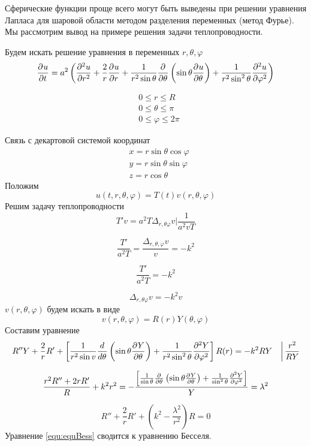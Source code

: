 Сферические функции проще всего могут быть выведены при решении уравнения Лапласа для шаровой области методом разделения переменных (метод Фурье). \\
Мы рассмотрим вывод на примере решения задачи теплопроводности.

Будем искать решение уравнения в переменных $r, \theta, \varphi$
\[
    \frac{\partial^{}u}{\partial t^{}} = a^2 \left(\frac{\partial^{2}u}{\partial r^{2}} + \frac{2}{r} \frac{\partial^{}u}{\partial r^{}} + \frac{1}{r^2 \sin \theta} \frac{\partial^{}}{\partial \theta^{}} \left(\sin \theta \frac{\partial^{}u}{\partial \theta^{}}\right) + \frac{1}{r^2 \sin^2 \theta} \frac{\partial^{2}u}{\partial \varphi^{2}}\right)
\]

\begin{align*}
      &0 \leqslant r \leqslant R\\
	&0 \leqslant \theta \leqslant \pi\\
	&0 \leqslant \varphi \leqslant 2 \pi
\end{align*}



Связь с декартовой системой координат
\begin{align*}
      &x = r \sin \theta \cos \varphi\\
	&y = r \sin \theta \sin \varphi\\
	&z = r \cos \theta
\end{align*}
Положим 
\[
    u(t, r, \theta, \varphi) = T(t) v (r, \theta, \varphi)
\]
Решим задачу теплопроводности
\[
    T' v = a^2 T \Delta_{r, \theta \varphi} v \Big| \frac{1}{a^2 v T}
\]

\[
    \frac{T'}{a^2 T} = \frac{\Delta_{r, \theta, \varphi} v}{v} = - k^2
\]

\[
    \frac{T'}{a^2 T} = - k^2
\]

\[
    \Delta_{r, \theta  \varphi} v = - k^2 v
\]
$v(r, \theta, \varphi)$ будем искать в виде
\[
    v(r, \theta, \varphi) = R(r) Y(\theta, \varphi)
\]
Составим уравнение
\[
   \left. R'' Y + \frac{2}{r} R' + \left[\frac{1}{r^2 \sin v} \frac{d^{}}{d\theta^{}} \left( \sin \theta \frac{\partial^{}Y}{\partial \theta^{}}\right)  + \frac{1}{r^2 \sin^2 \theta} \frac{\partial^{2}Y}{\partial \varphi^{2}}\right]R(r) = - k^2 R Y \quad \right| \frac{r^2}{R Y}
\]

\[
    \frac{r^2 R'' + 2 r R'}{R} + k^2 r^2 = - \frac{\left[ \frac{1}{\sin \theta} \frac{\partial^{}}{\partial \theta^{}} \left( \sin \theta \frac{\partial^{}Y}{\partial \theta^{}} \right) + \frac{1}{\sin^2 \theta} \frac{\partial^{2}Y}{\partial \varphi^{2}}\right]}{Y} = \lambda^2
\]


\begin{equation}
    R'' + \frac{2}{r} R' + \left(k^2 - \frac{\lambda^2}{r^2}\right) R = 0
	\label{equ:equBess}
\end{equation}
Уравнение \eqref{equ:equBess} сводится к уравнению Бесселя.

